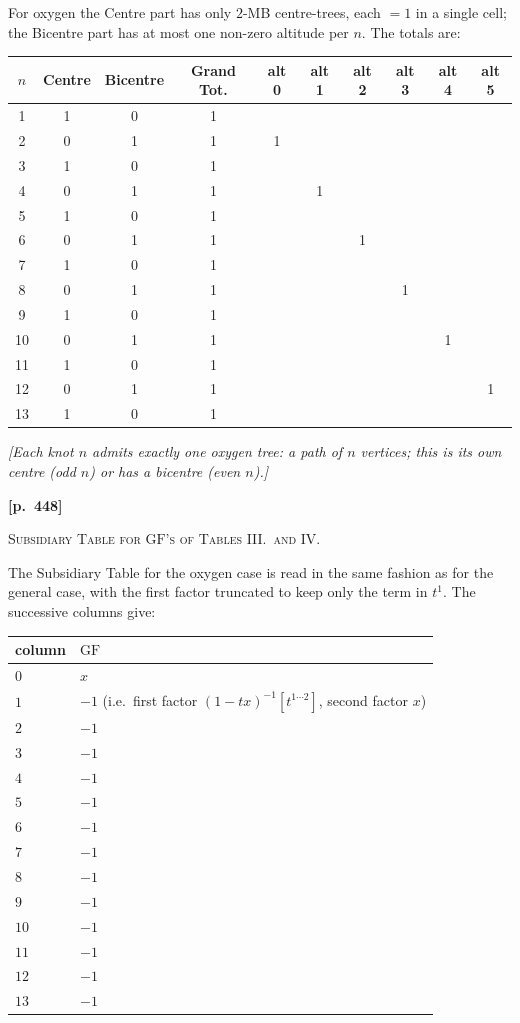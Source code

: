\documentclass[11pt,a4paper]{article}
\providecommand{\GF}{\mathrm{GF}}
\begin{document}
\noindent For oxygen the Centre part has only $2$-MB centre-trees, each $=1$ in a single cell; the Bicentre part has at most one non-zero altitude per $n$. The totals are:
\begin{center}
\begin{tabular}{c|cc|c|cccccc}
$n$ & Centre & Bicentre & Grand Tot. & alt 0 & alt 1 & alt 2 & alt 3 & alt 4 & alt 5\\\hline
1 & 1 & 0 & 1 & & & & & &\\
2 & 0 & 1 & 1 & 1 & & & & &\\
3 & 1 & 0 & 1 & & & & & &\\
4 & 0 & 1 & 1 & & 1 & & & &\\
5 & 1 & 0 & 1 & & & & & &\\
6 & 0 & 1 & 1 & & & 1 & & &\\
7 & 1 & 0 & 1 & & & & & &\\
8 & 0 & 1 & 1 & & & & 1 & &\\
9 & 1 & 0 & 1 & & & & & &\\
10 & 0 & 1 & 1 & & & & & 1 &\\
11 & 1 & 0 & 1 & & & & & &\\
12 & 0 & 1 & 1 & & & & & & 1\\
13 & 1 & 0 & 1 & & & & & &
\end{tabular}
\end{center}

\noindent\textit{[Each knot $n$ admits exactly one oxygen tree: a path of $n$ vertices; this is its own centre (odd $n$) or has a bicentre (even $n$).]}

\newpage
\noindent\textbf{[p.~448]}\quad
\begin{center}
\textsc{Subsidiary Table for $\GF$'s of Tables III.\ and IV.}
\end{center}

\noindent The Subsidiary Table for the oxygen case is read in the same fashion as for the general case, with the first factor truncated to keep only the term in $t^{1}$. The successive columns give:
\begin{center}
\begin{tabular}{l|l}
column & $\GF$\\\hline
$0$ & $x$\\
$1$ & $-1$ (i.e.\ first factor $(1-tx)^{-1}[t^{1\cdots2}]$, second factor $x$)\\
$2$ & $-1$\\
$3$ & $-1$\\
$4$ & $-1$\\
$5$ & $-1$\\
$6$ & $-1$\\
$7$ & $-1$\\
$8$ & $-1$\\
$9$ & $-1$\\
$10$ & $-1$\\
$11$ & $-1$\\
$12$ & $-1$\\
$13$ & $-1$
\end{tabular}
\end{center}
\end{document}
